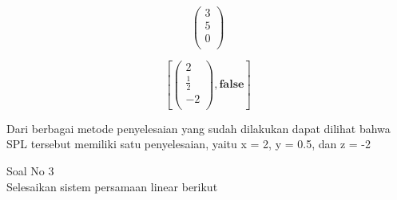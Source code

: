 \begin{eulernotebook}
\begin{eulercomment}
\begin{eulercomment}
\begin{eulercomment}
\begin{eulercomment}
\begin{eulerformula}
\[
\begin{pmatrix}3 \\ 5 \\ 0 \\ \end{pmatrix}
\]
\end{eulerformula}
\begin{eulerformula}
\[
\left[ \begin{pmatrix}2 \\ \frac{1}{2} \\ -2 \\ \end{pmatrix} , 
 \mathbf{false} \right] 
\]
\end{eulerformula}
\begin{eulercomment}
Dari berbagai metode penyelesaian yang sudah dilakukan dapat dilihat
bahwa SPL tersebut memiliki satu penyelesaian, yaitu x = 2, y = 0.5,
dan z = -2

\end{eulercomment}
\eulersubheading{}
\begin{eulercomment}
Soal No 3\\
Selesaikan sistem persamaan linear berikut


\end{eulercomment}
\end{eulercomment}
\end{eulercomment}
\end{eulercomment}
\end{eulercomment}
\end{eulernotebook}
